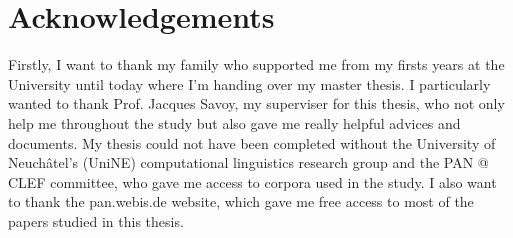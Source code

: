 \chapter*{Acknowledgements}
Firstly, I want to thank my family who supported me from my firsts years at the University until today where I'm handing over my master thesis.
I particularly wanted to thank Prof. Jacques Savoy, my superviser for this thesis, who not only help me throughout the study but also gave me really helpful advices and documents.
My thesis could not have been completed without the University of Neuchâtel's (UniNE) computational linguistics research group and the PAN @ CLEF committee, who gave me access to corpora used in the study.
I also want to thank the pan.webis.de website, which gave me free access to most of the papers studied in this thesis.
